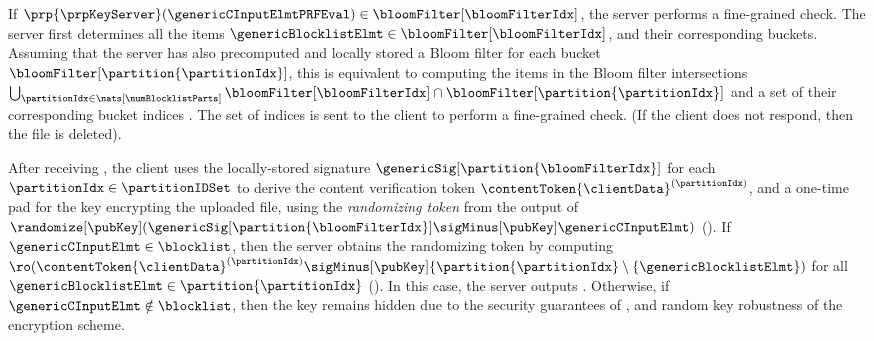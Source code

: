%


If $\prp{\prpKeyServer}(\genericCInputElmtPRFEval) \in \bloomFilter[\bloomFilterIdx]$, the server performs a fine-grained check. The server first determines all the items $\genericBlocklistElmt \in \bloomFilter[\bloomFilterIdx]$, and their corresponding buckets. Assuming that the server has also precomputed and locally stored a Bloom filter for each bucket $\bloomFilter[\partition{\partitionIdx}]$, this is equivalent to computing the items in the Bloom filter intersections $\bigcup_{\partitionIdx \in \nats[\numBlocklistParts]} \bloomFilter[\bloomFilterIdx] \cap \bloomFilter[\partition{\partitionIdx}]$ and a set of their corresponding bucket indices \partitionIDSet. The set of indices is sent to the client to perform a fine-grained check. (If the client does not respond, then the file is deleted). 



After receiving \partitionIDSet, the client uses the locally-stored signature $\genericSig[\partition{\bloomFilterIdx}]$ for each $\partitionIdx \in \partitionIDSet$ to derive the content verification token 
$\contentToken{\clientData}^{(\partitionIdx)}$, and a one-time pad for the key encrypting the uploaded file, using the \emph{randomizing token} from the output of $\randomize[\pubKey](\genericSig[\partition{\bloomFilterIdx}] \sigMinus[\pubKey] \genericCInputElmt)$ (). If $\genericCInputElmt \in \blocklist$, then the server obtains the randomizing token by computing $\ro(\contentToken{\clientData}^{(\partitionIdx)} \sigMinus[\pubKey] \{\partition{\partitionIdx} \setminus \{\genericBlocklistElmt\})$ for all $\genericBlocklistElmt \in \partition{\partitionIdx}$ (). In this case, the server outputs \clientData. Otherwise, if $\genericCInputElmt \notin \blocklist$, then the key remains hidden due to the security guarantees of \ourSigScheme, and random key robustness of the encryption scheme.  

